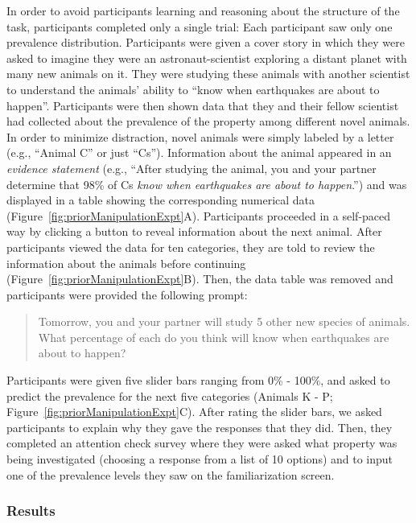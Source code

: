 \documentclass[floatsintext,doc]{apa6}
\begin{document}
%
In order to avoid participants learning and reasoning about the structure of the task, participants completed only a single trial: Each participant saw only one prevalence distribution.
Participants were given a cover story in which they were asked to imagine they were an astronaut-scientist exploring a distant planet with many new animals on it.
They were studying these animals with another scientist to understand the animals' ability to \enquote{know when earthquakes are about to happen}.
Participants were then shown data that they and their fellow scientist had collected about the prevalence of the property among different novel animals.
In order to minimize distraction, novel animals were simply labeled by a letter (e.g., \enquote{Animal C} or just \enquote{Cs}).
Information about the animal appeared in an \emph{evidence statement} (e.g., \enquote{After studying the animal, you and your partner determine that 98\% of Cs \emph{know when earthquakes are about to happen}.}) and was displayed in a table showing the corresponding numerical data (Figure~\ref{fig:priorManipulationExpt}A).
Participants proceeded in a self-paced way by clicking a button to reveal information about the next animal.
After participants viewed the data for ten categories, they are told to review the information about the animals before continuing (Figure~\ref{fig:priorManipulationExpt}B).
Then, the data table was removed and participants were provided the following prompt:

\begin{quote}
Tomorrow, you and your partner will study 5 other new species of animals. What percentage of each do you think will know when earthquakes are about to happen?
\end{quote}

Participants were given five slider bars ranging from 0\% - 100\%, and asked to predict the prevalence for the next five categories (Animals K - P; Figure~\ref{fig:priorManipulationExpt}C).
After rating the slider bars, we asked participants to explain why they gave the responses that they did.
Then, they completed an attention check survey where they were asked what property was being investigated (choosing a response from a list of 10 options) and to input one of the prevalence levels they saw on the familiarization screen.

\hypertarget{results-1}{%
\subsubsection{Results}\label{results-1}}
\end{document}
